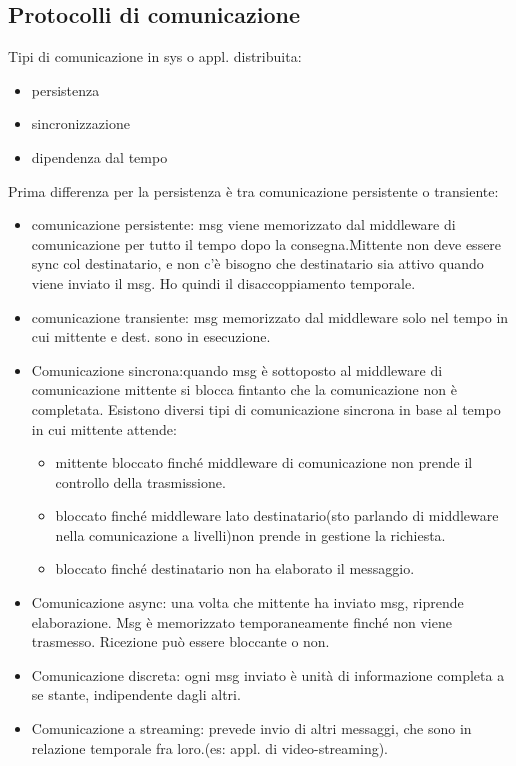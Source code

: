 \documentclass[16px]{article}
\begin{document}
\subsection{Protocolli di comunicazione}
Tipi di comunicazione in sys o appl. distribuita:
\begin{itemize}
\item persistenza
\item sincronizzazione
\item dipendenza dal tempo
\end{itemize}
Prima differenza per la persistenza è tra comunicazione persistente o transiente:
\begin{itemize}
\item comunicazione persistente: msg viene memorizzato dal middleware di comunicazione per tutto il tempo dopo la consegna.Mittente non deve essere sync col destinatario, e non c'è bisogno che destinatario sia attivo quando viene  inviato il msg. Ho quindi il disaccoppiamento temporale.
\item comunicazione transiente: msg memorizzato dal middleware solo nel tempo in cui mittente e dest. sono in esecuzione.
\item Comunicazione sincrona:quando msg è sottoposto al middleware di comunicazione mittente si blocca fintanto che la comunicazione non è completata. Esistono diversi tipi di comunicazione sincrona in base al tempo in cui mittente attende:
\begin{itemize}
\item mittente bloccato finché middleware di comunicazione non prende il controllo della trasmissione.
\item bloccato finché middleware lato destinatario(sto parlando di middleware nella comunicazione a livelli)non prende in gestione la richiesta.
\item bloccato finché destinatario non ha elaborato il messaggio.
\end{itemize}
\item Comunicazione async: una volta che mittente ha inviato msg, riprende elaborazione. Msg è memorizzato temporaneamente finché non viene trasmesso. Ricezione può essere bloccante o non.
\item Comunicazione discreta: ogni msg inviato è unità di informazione completa a se stante, indipendente dagli altri.
\item Comunicazione a streaming: prevede invio di altri messaggi, che sono in relazione temporale fra loro.(es: appl. di video-streaming).
\end{itemize}
\end{document}
